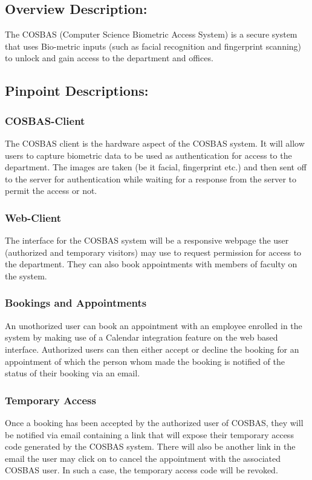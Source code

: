 \subsection{Overview Description:}
	The COSBAS (Computer Science Biometric Access System) is a secure system that uses Bio-metric inputs (such as facial recognition and fingerprint scanning) to unlock and gain access to the department and offices.
	
\subsection{Pinpoint Descriptions:}
	\subsubsection{COSBAS-Client}
	The COSBAS client is the hardware aspect of the COSBAS system. It will allow users to capture biometric data to be used as authentication for access to the department. The images are taken (be it facial, fingerprint etc.) and then sent off to the server for authentication while waiting for a response from the server to permit the access or not.
	
	\subsubsection{Web-Client}
	The interface for the COSBAS system will be a responsive webpage the user (authorized and temporary visitors) may use to request permission for access to the department. They can also book appointments with members of faculty on the system.
	
	\subsubsection{Bookings and Appointments}
	An unothorized user can book an appointment with an employee enrolled in the system by making use of a Calendar integration feature on the web based interface. Authorized users can then either accept or decline the booking for an appointment of which the person whom made the booking is notified of the status of their booking via an email.
	
	\subsubsection{Temporary Access}
	Once a booking has been accepted by the authorized user of COSBAS, they will be notified via email containing a link that will expose their temporary access code generated by the COSBAS system. There will also be another link in the email the user may click on to cancel the appointment with the associated COSBAS user. In such a case, the temporary access code will be revoked.